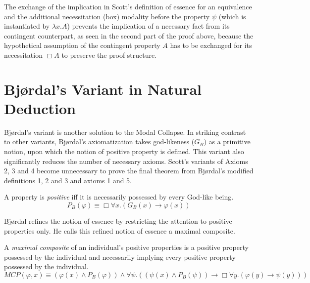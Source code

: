 \documentclass[smallextended]{svjour3}
\newcommand{\imp}{\rightarrow}
\newcommand{\all}{\forall}
\newcommand{\nec}{\Box} %
\begin{document}
The exchange of the implication in Scott's definition of essence for an equivalence and the additional necessitation (box) modality before the property $\psi$ (which is instantiated by $\lambda x. A$) prevents the implication of a necessary fact from its contingent counterpart, as seen in the second part of the proof above, because the hypothetical assumption of the contingent property $A$ has to be exchanged for its necessitation $\nec A$ to preserve the proof structure. 



\section{Bj{\o}rdal's Variant in Natural Deduction}
\label{sec:bjordal}


\setcounter{lemma}{0}
\setcounter{theorem}{0}
\setcounter{corollary}{0}


Bj{\o}rdal's variant \citep{bjordal,fuhrmann} is another solution to the Modal Collapse. In striking contrast to other variants, Bj\o rdal's axiomatization takes god-likeness ($G_B$) as a primitive notion, upon which the notion of positive property is defined. This variant also significantly reduces the number of necessary axioms. Scott's variants of Axioms 2, 3 and 4 become unnecessary to prove the final theorem from Bj{\o}rdal's modified definitions 1, 2 and 3 and axioms 1 and 5.


\setcounter{definition}{0}
\begin{definition}[Changed]
\label{B:D1}
A property is \emph{positive} iff it is necessarily possessed by every God-like being.
$$
P_B(\varphi) \equiv \nec \all x. (G_B(x) \imp \varphi(x))
$$
\end{definition}

Bj{\o}rdal refines the notion of essence by restricting the attention to positive properties only. He calls this refined notion of essence a maximal composite.

\newcommand{\MCP}{\mathit{MCP}}

\begin{definition}[Changed]
\label{B:D2}
A \emph{maximal composite} of an individual's positive properties is a positive property possessed by the individual and necessarily implying every positive property possessed by the individual.
$$\MCP(\varphi, x) \equiv (\varphi(x) \wedge P_B (\varphi)) \wedge \all\psi.((\psi(x) \wedge P_B (\psi)) \imp \nec\all y.(\varphi(y) \imp \psi(y)))
$$
\end{definition}
\end{document}
